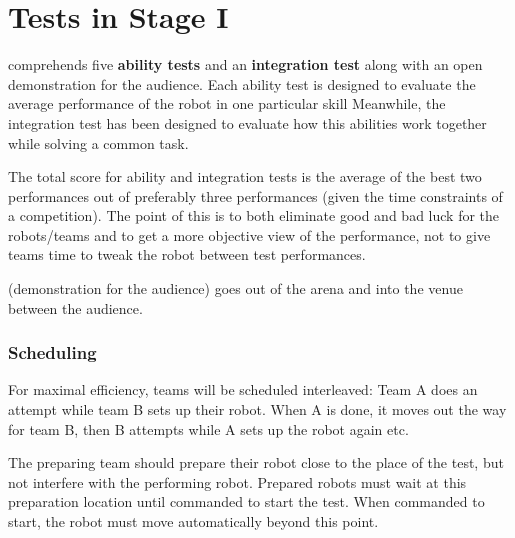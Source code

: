 \documentclass[11pt, twoside, openright, a4paper, chapterprefix]{scrbook}
\begin{document}


\pagestyle{empty}

\clearpage

\pagestyle{empty}
\tableofcontents
\clearpage

\pagestyle{plain}









\chapter{Tests in Stage I}
\label{chap:stage_I}

\begin{itshape}
 comprehends five \textbf{ability tests} and an \textbf{integration test} along with an open demonstration for the audience.
Each ability test is designed to evaluate the average performance of the robot in one particular skill
Meanwhile, the integration test has been designed to evaluate how this abilities work together while solving a common task.

The total score for ability and integration tests is the average of the best two performances out of preferably three performances (given the time constraints of a competition).
The point of this is to both eliminate good and bad luck for the robots/teams and to get a more objective view of the performance,
  not to give teams time to tweak the robot between test performances.

 (demonstration for the audience) goes out of the arena and into the venue between the audience.

\end{itshape}

\subsection*{Scheduling}
For maximal efficiency, teams will be scheduled interleaved:
  Team A does an attempt while team B sets up their robot. When A is done, it moves out the way for team B, then B attempts while A sets up the robot again etc.

The preparing team should prepare their robot close to the place of the test, but not interfere with the performing robot.
Prepared robots must wait at this preparation location until commanded to start the test.
When commanded to start, the robot must move automatically beyond this point.
\end{document}
